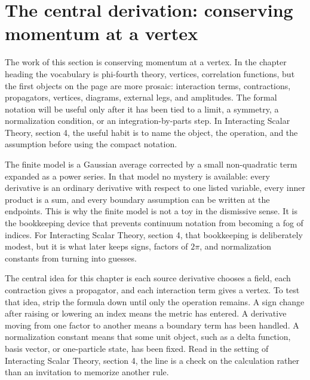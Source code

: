 \section{The central derivation: conserving momentum at a vertex}













The work of this section is conserving momentum at a vertex.  In the chapter heading the vocabulary is phi-fourth theory, vertices, correlation functions, but the first objects on the page are more prosaic: interaction terms, contractions, propagators, vertices, diagrams, external legs, and amplitudes.  The formal notation will be useful only after it has been tied to a limit, a symmetry, a normalization condition, or an integration-by-parts step.  In Interacting Scalar Theory, section 4, the useful habit is to name the object, the operation, and the assumption before using the compact notation.

The finite model is a Gaussian average corrected by a small non-quadratic term expanded as a power series.  In that model no mystery is available: every derivative is an ordinary derivative with respect to one listed variable, every inner product is a sum, and every boundary assumption can be written at the endpoints.  This is why the finite model is not a toy in the dismissive sense.  It is the bookkeeping device that prevents continuum notation from becoming a fog of indices.  For Interacting Scalar Theory, section 4, that bookkeeping is deliberately modest, but it is what later keeps signs, factors of \(2\pi\), and normalization constants from turning into guesses.

The central idea for this chapter is each source derivative chooses a field, each contraction gives a propagator, and each interaction term gives a vertex.  To test that idea, strip the formula down until only the operation remains.  A sign change after raising or lowering an index means the metric has entered.  A derivative moving from one factor to another means a boundary term has been handled.  A normalization constant means that some unit object, such as a delta function, basis vector, or one-particle state, has been fixed.  Read in the setting of Interacting Scalar Theory, section 4, the line is a check on the calculation rather than an invitation to memorize another rule.


